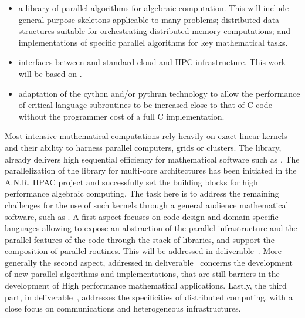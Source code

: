 \begin{workpackage}
\begin{tasklist}
\begin{task}[title=GAP,id=hpc-gap,PM=18, lead=SA]
\begin{itemize}
\item a library of parallel algorithms for algebraic computation. This
  will include general purpose skeletons applicable to many problems;
  distributed data structures suitable for orchestrating distributed
  memory computations; and implementations of specific parallel algorithms for key
  mathematical tasks.  
\item interfaces between \GAP and standard cloud and HPC
  infrastructure. This work will be based on .
\item adaptation of the cython and/or pythran technology to allow the
  performance of critical \GAP language subroutines to be increased
  close to that of C code without the programmer cost of a full C implementation.
\end{itemize}
\end{task}

\begin{task}[title=Linbox,PM=40,id=hpc-linbox, lead=UJF,wphases=3-48]
Most intensive mathematical computations rely heavily on exact linear kernels
and their ability to harness parallel computers, grids or clusters. The \Linbox
library, already delivers high sequential efficiency for mathematical software
such as \Sage. The parallelization of the library for multi-core architectures
has been initiated in the A.N.R. HPAC project and successfully set the building
blocks for high performance algebraic computing. 
The task here is to  address the remaining challenges for the use of such
kernels through a general audience mathematical software, such as \Sage.
A first aspect focuses on code design and domain specific languages allowing to
expose an abstraction of the parallel infrastructure and the parallel features
of the code through the stack of libraries, and support the
composition of parallel routines. This will be addressed in
deliverable~. More generally the second aspect, addressed
in deliverable~ concerns the 
development of new parallel algorithms and implementations, that are still
barriers in the development of High performance mathematical
applications. Lastly, the third part, in
deliverable~, addresses the specificities of  distributed
computing, with a close focus on communications and heterogeneous infrastructures.


\end{task}
\end{tasklist}
\end{workpackage}
